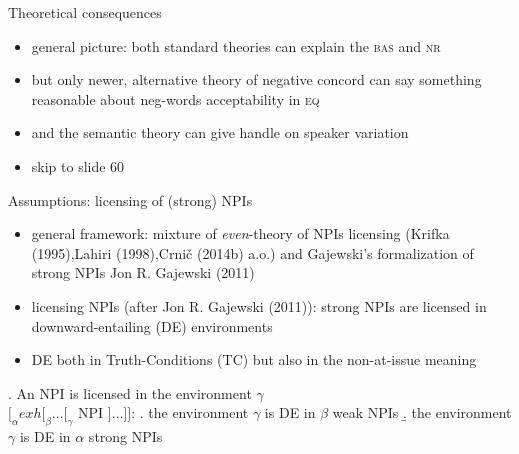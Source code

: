 \documentclass[
  ignorenonframetext,
]{beamer}
\providecommand{\tightlist}{%
  \setlength{\itemsep}{0pt}\setlength{\parskip}{0pt}}\usepackage{longtable,booktabs,array}
\begin{document}
\begin{frame}{Theoretical consequences}
\protect\hypertarget{theoretical-consequences}{}
\begin{itemize}
\tightlist
\item
  general picture: both standard theories can explain the \textsc{bas}
  and \textsc{nr}
\item
  but only newer, alternative theory of negative concord can say
  something reasonable about neg-words acceptability in \textsc{eq}
\item
  and the semantic theory can give handle on speaker variation
\item
  skip to slide 60
\end{itemize}
\end{frame}

\begin{frame}
\begin{block}{Assumptions: licensing of (strong) NPIs}
\protect\hypertarget{assumptions-licensing-of-strong-npis}{}
\begin{itemize}
\tightlist
\item
  general framework: mixture of \emph{even}-theory of NPIs licensing
  (Krifka (1995),Lahiri (1998),Crnič (2014b) a.o.) and Gajewski's
  formalization of strong NPIs Jon R. Gajewski (2011)
\item
  licensing NPIs (after Jon R. Gajewski (2011)): strong NPIs are
  licensed in downward-entailing (DE) environments
\item
  DE both in Truth-Conditions (TC) but also in the non-at-issue meaning
\end{itemize}

\ex. An NPI is licensed in the environment \(\gamma\)\\
\([_\alpha exh [_\beta \ldots [_\gamma\) NPI \(] \ldots ]]\): \a. the
environment \(\gamma\) is DE in \(\beta\) \hfill weak NPIs \b. the
environment \(\gamma\) is DE in \(\alpha\) \hfill strong NPIs

~
\end{block}
\end{frame}
\end{document}
